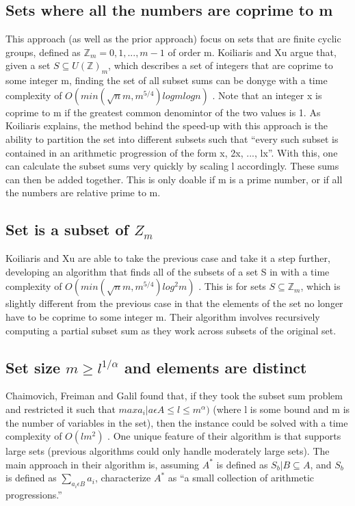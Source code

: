 \documentclass{article}
\begin{document}
\subsection{Sets where all the numbers are coprime to m}
This approach (as well as the prior approach) focus on sets that are finite
cyclic groups, defined as $\mathbb{Z}_m = {0, 1, ..., m-1}$ of order m.
Koiliaris and Xu argue that, given a set $S \subseteq U(\mathbb{Z})_m$, which
describes a set of integers that are coprime to some integer m, finding
the set of all subset sums can be donyge with a time complexity of
$O(min(\sqrt{n}m,m^{5/4})log m log n)$ \cite{koiliaris2016}.
Note that an integer x is
coprime to m if the greatest common denomintor of the two values is 1.
As Koiliaris explains, the method behind the speed-up with this approach
is the ability to partition the set into different subsets such that ``every
such subset is contained in an arithmetic progression of the form
x, 2x, ..., lx''. With this, one can calculate the subset sums very quickly
by scaling l accordingly. These sums can then be added together. This is
only doable if m is a prime number, or if all the numbers are relative prime
to m.

\subsection{Set is a subset of $Z_m$}
Koiliaris and Xu are able to take the previous case and take it a step further,
developing an algorithm that finds all of the subsets of a set S in with a
time complexity of $O(min(\sqrt{n}m,m^{5/4})log^2m)$  \cite{koiliaris2016}.
This is for sets $S \subseteq \mathbb{Z}_m$, which is slightly different from
the previous case in that the elements of the set no longer have to be
coprime to some integer m.
Their algorithm involves recursively computing a partial subset sum
as they work across subsets of the original set.

\subsection{Set size $m \geq l^{1/\alpha}$ and elements are distinct}
Chaimovich, Freiman and Galil found that, if they took the subset sum
problem and restricted it such that $max{a_i | a \epsilon A} \leq l \leq
m^\alpha)$ (where l is some bound and m is the number of variables in the set),
then the instance could be solved with a time complexity of $O(lm^2)$
\cite{chaimovich1989}. One unique
feature of their algorithm is that supports large sets (previous algorithms
could only handle moderately large sets). The main approach in their algorithm
is, assuming $A^*$ is defined as ${S_b | B \subseteq A}$, and $S_b$ is
defined as $\sum_{a_i\epsilon B} a_i$, characterize $A^*$ as ``a small
collection of
arithmetic progressions.'' 
\end{document}
